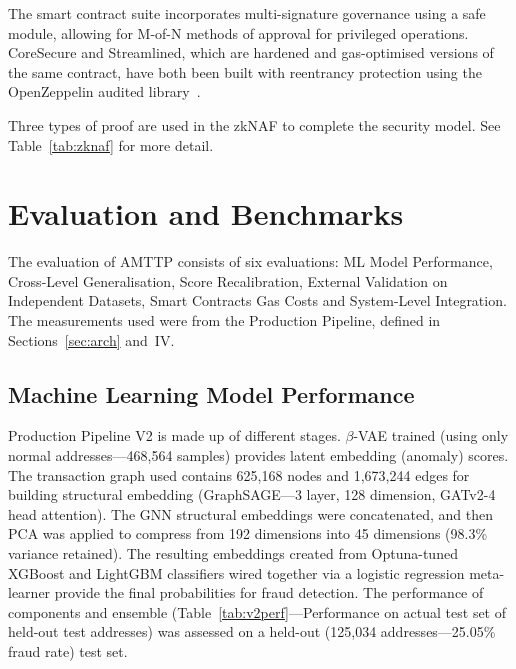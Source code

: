 \documentclass[journal]{IEEEtran}
\begin{document}
The smart contract suite incorporates multi-signature governance using a safe module, allowing for M-of-N methods of approval for privileged operations. CoreSecure and Streamlined, which are hardened and gas-optimised versions of the same contract, have both been built with reentrancy protection using the OpenZeppelin audited library~\cite{openzeppelin2024}.

Three types of proof are used in the zkNAF to complete the security model. See Table~\ref{tab:zknaf} for more detail.

\section{Evaluation and Benchmarks}

The evaluation of AMTTP consists of six evaluations: ML Model Performance, Cross-Level Generalisation, Score Recalibration, External Validation on Independent Datasets, Smart Contracts Gas Costs and System-Level Integration. The measurements used were from the Production Pipeline, defined in Sections~\ref{sec:arch} and~IV.

\subsection{Machine Learning Model Performance}

Production Pipeline V2 is made up of different stages. $\beta$-VAE trained (using only normal addresses---468,564 samples) provides latent embedding (anomaly) scores. The transaction graph used contains 625,168 nodes and 1,673,244 edges for building structural embedding (GraphSAGE---3 layer, 128 dimension, GATv2-4 head attention). The GNN structural embeddings were concatenated, and then PCA was applied to compress from 192 dimensions into 45 dimensions (98.3\% variance retained). The resulting embeddings created from Optuna-tuned XGBoost and LightGBM classifiers wired together via a logistic regression meta-learner provide the final probabilities for fraud detection. The performance of components and ensemble (Table~\ref{tab:v2perf}---Performance on actual test set of held-out test addresses) was assessed on a held-out (125,034 addresses---25.05\% fraud rate) test set.
\end{document}
